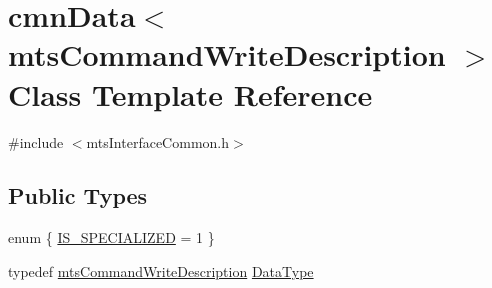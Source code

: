 \hypertarget{classcmn_data_3_01mts_command_write_description_01_4}{}\section{cmn\+Data$<$ mts\+Command\+Write\+Description $>$ Class Template Reference}
\label{classcmn_data_3_01mts_command_write_description_01_4}


{\ttfamily \#include $<$mts\+Interface\+Common.\+h$>$}

\subsection*{Public Types}
\begin{DoxyCompactItemize}
\item 
enum \{ \hyperlink{classcmn_data_3_01mts_command_write_description_01_4_a725d2f70629252fd559aaf3717bf6e8bae2caea2590f7eb75e8bedba06a609904}{I\+S\+\_\+\+S\+P\+E\+C\+I\+A\+L\+I\+Z\+E\+D} = 1
 \}
\item 
typedef \hyperlink{classmts_command_write_description}{mts\+Command\+Write\+Description} \hyperlink{classcmn_data_3_01mts_command_write_description_01_4_aed29f1a95e5884bf865916b40933e824}{Data\+Type}
\end{DoxyCompactItemize}
